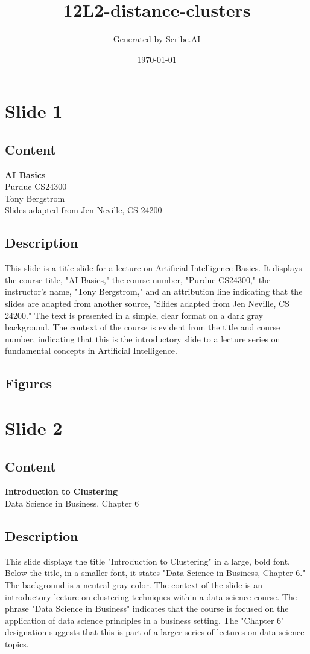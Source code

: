 \documentclass{article}%
\title{12L2{-}distance{-}clusters}%
\author{Generated by Scribe.AI}%
\date{\today}%
\begin{document}
%
\normalsize%
\maketitle%
\section{Slide 1}%
\label{sec:Slide1}%
\subsection{Content}%

\textbf{AI Basics} \\
Purdue CS24300 \\
Tony Bergstrom \\
Slides adapted from Jen Neville, CS 24200
%
\subsection{Description}%
This slide is a title slide for a lecture on Artificial Intelligence Basics.  It displays the course title, "AI Basics," the course number, "Purdue CS24300," the instructor's name, "Tony Bergstrom," and an attribution line indicating that the slides are adapted from another source, "Slides adapted from Jen Neville, CS 24200."  The text is presented in a simple, clear format on a dark gray background.  The context of the course is evident from the title and course number, indicating that this is the introductory slide to a lecture series on fundamental concepts in Artificial Intelligence.%
\subsection{Figures}%
\begin{figure}[H]%
\centering%
\end{figure}

%
\newpage%
\section{Slide 2}%
\label{sec:Slide2}%
\subsection{Content}%

\textbf{Introduction to Clustering} \\
Data Science in Business, Chapter 6
%
\subsection{Description}%
This slide displays the title "Introduction to Clustering" in a large, bold font.  Below the title, in a smaller font, it states "Data Science in Business, Chapter 6."  The background is a neutral gray color.  The context of the slide is an introductory lecture on clustering techniques within a data science course.  The phrase "Data Science in Business" indicates that the course is focused on the application of data science principles in a business setting. The "Chapter 6" designation suggests that this is part of a larger series of lectures on data science topics.%
\end{document}
